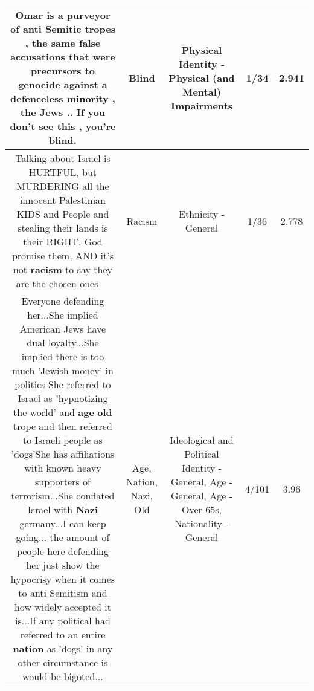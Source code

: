 \documentclass[11pt]{article}
\newlength\mylength
\begin{document}
\begin{center}
\begin{longtable}{|C{.65\mylength}|C{.30\mylength}|C{.12\mylength}|C{.12\mylength}|C{.12\mylength}|}
  \small Omar is a purveyor of anti Semitic tropes , the same false accusations that were precursors to genocide against a defenceless minority , the Jews .. If you don't see this , you're \textbf{blind}.\normalsize   & Blind & Physical Identity - Physical (and Mental) Impairments & 1/34 & 2.941 \\  \hline
  \small Talking about Israel is HURTFUL, but MURDERING all the innocent Palestinian KIDS and People  and stealing their lands is their RIGHT, God promise them, AND it's not \textbf{racism} to say they are the chosen ones 🤮🤮🤮\normalsize   & Racism & Ethnicity - General & 1/36 & 2.778 \\  \hline
  \small Everyone defending her...She implied American Jews have dual loyalty...She implied there is too much 'Jewish money' in politics She referred to Israel as 'hypnotizing the world' and \textbf{age} \textbf{old} trope and then referred to Israeli people as 'dogs'She has affiliations with known heavy supporters of terrorism...She conflated Israel with \textbf{Nazi} germany...I can keep going... the amount of people here defending her just show the hypocrisy when it comes to anti Semitism and how widely accepted it is...If any political had referred to an entire \textbf{nation} as 'dogs' in any other circumstance is would be bigoted...\normalsize   & Age, Nation, Nazi, Old &  Ideological and Political Identity - General, Age - General, Age - Over 65s, Nationality - General & 4/101 & 3.96 \\  \hline

\end{longtable}
\end{center}
\end{document}
